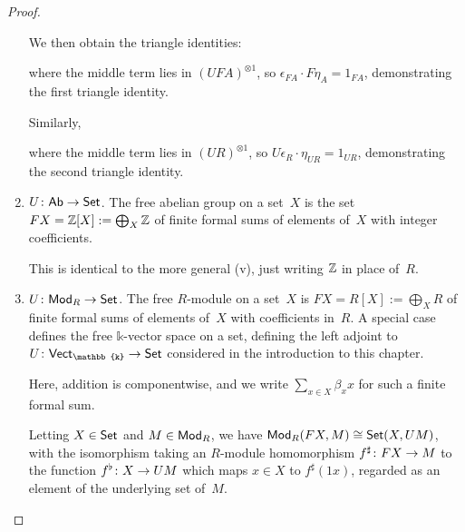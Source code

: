\documentclass[../../solutions]{subfiles}
\begin{document}
\begin{proof}
\begin{enumerate}[label=(\roman*)]
    We then obtain the triangle identities:
    \begin{center}
    \end{center}
    where the middle term lies in $(UFA)^{\otimes1}$, so
    $\epsilon_{FA}\cdot F\eta_A=1_{FA}$, demonstrating the first
    triangle identity.

    Similarly,
    \begin{center}
    \end{center}
    where the middle term lies in $(UR)^{\otimes1}$, so
    $U\epsilon_R\cdot \eta_{UR}=1_{UR}$, demonstrating the second
    triangle identity.

  \item ${U}\colon{\ensuremath{\mathsf{Ab}}}\to{\ensuremath{\mathsf{Set}}}$.  The free abelian group on a set~$X$ is
    the set $FX={\mathbb{Z}}[X]:=\bigoplus_X {\mathbb{Z}}$ of finite formal sums of
    elements of~$X$ with integer coefficients.

    This is identical to the more general (v), just writing ${\mathbb{Z}}$ in
    place of~$R$.

  \item  ${U}\colon{\ensuremath{\mathsf{Mod}_{R}}}\to{\ensuremath{\mathsf{Set}}}$.  The free $R$-module on a set~$X$ is
    $FX=R[X]:=\bigoplus_X R$ of finite formal sums of
    elements of~$X$ with coefficients in~$R$.  A special case defines
    the free $\mathbb{k}$-vector space on a set, defining the left
    adjoint to $\func{U}{\Vect{\mathbb{k}}}{\Set}$ considered in the
    introduction to this chapter.

    Here, addition is componentwise, and we write
    $\sum_{x\in X} \beta_x x$ for such a finite formal sum.

    Letting $X\in\mathsf{Set}$ and $M\in\mathsf{Mod}_{R}$, we have
    $\mathsf{Mod}_{R}(FX, M)\cong \mathsf{Set}(X,UM)$, with the isomorphism taking an
    $R$-module homomorphism ${f^\sharp}\colon{FX}\to{M}$ to the function
    ${f^\flat}\colon{X}\to{UM}$ which maps $x\in X$ to $f^\sharp(1x)$,
    regarded as an element of the underlying set of~$M$.


\end{enumerate}
\end{proof}
\end{document}
